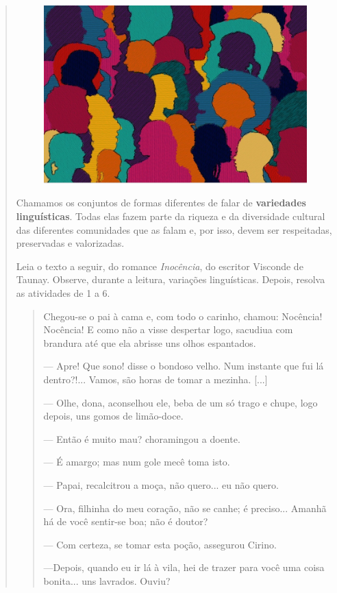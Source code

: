 \begin{quote}
{\begin{figure}
\includegraphics[width=.5\textwidth]{./imgs/img18.jpg}
\end{figure}

Chamamos os conjuntos de formas diferentes de falar de \textbf{variedades
linguísticas}. Todas elas fazem parte da riqueza e da diversidade cultural
das diferentes comunidades que as falam e, por isso, devem ser respeitadas,
preservadas e valorizadas.
\vspace{1cm}}
\pagebreak


Leia o texto a seguir, do romance \emph{Inocência}, do escritor Visconde
de Taunay. Observe, durante a leitura, variações linguísticas. Depois, resolva as atividades de 1 a 6.

\begin{quote}
Chegou-se o pai à cama e, com todo o carinho, chamou: Nocência!
Nocência! E como não a visse despertar logo, sacudiua com brandura até
que ela abrisse uns olhos espantados.

--- Apre! Que sono! disse o bondoso velho. Num instante que fui lá
dentro?!... Vamos, são horas de tomar a mezinha. {[}...{]}

--- Olhe, dona, aconselhou ele, beba de um só trago e chupe, logo
depois, uns gomos de limão-doce.

--- Então é muito mau? choramingou a doente.

--- É amargo; mas num gole mecê toma isto.

--- Papai, recalcitrou a moça, não quero... eu não quero.

--- Ora, filhinha do meu coração, não se canhe; é preciso... Amanhã há
de você sentir-se boa; não é doutor?

--- Com certeza, se tomar esta poção, assegurou Cirino.

---Depois, quando eu ir lá à vila, hei de trazer para você uma coisa
bonita... uns lavrados. Ouviu?


\end{quote}
\end{quote}
